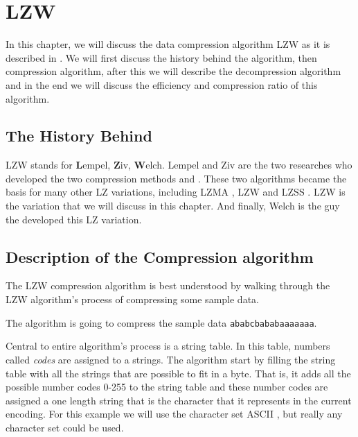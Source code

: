 \begin{comment}
  
\end{comment}

\chapter{LZW}
\label{cha:lzw}

\begin{refsection}

  In this chapter, we will discuss the data compression algorithm LZW
  as it is described in
  \cite{nelson89:_lzw_data_compr,Welch:1984:THD:1319729.1320134,Salomon:2004:DCC}. We
  will first discuss the history behind the algorithm, then
  compression algorithm, after this we will describe the decompression
  algorithm and in the end we will discuss the efficiency and
  compression ratio of this algorithm.

\section{The History Behind}

LZW stands for \textbf{L}empel, \textbf{Z}iv, \textbf{W}elch. Lempel
and Ziv are the two researches who developed the two compression
methods \lzseven and \lzeight. These two algorithms became the basis
for many other LZ variations, including LZMA \cite{palov11}, LZW and
LZSS \cite{Salomon:2004:DCC}. LZW is the variation that we will
discuss in this chapter. And finally, Welch is the guy the developed
this LZ variation.

\section{Description of the Compression algorithm}
\label{sec:lzw-comp-desc}

The LZW compression algorithm is best
understood by walking through the LZW algorithm's process of
compressing some sample data.

The algorithm is going to compress the sample data
\texttt{ababcbababaaaaaaa}.

Central to entire algorithm's process is a string table. In this
table, numbers called \textit{codes} are assigned to a
strings. The algorithm start by filling the string table with all the
strings that are possible to fit in a byte. That is, it adds all the
possible number codes 0-255 to the string table and these number codes
are assigned a one length string that is the character that it
represents in the current encoding. For this example we will use the
character set ASCII \cite{rfc20}, but really any character set could
be used.


\end{refsection}
